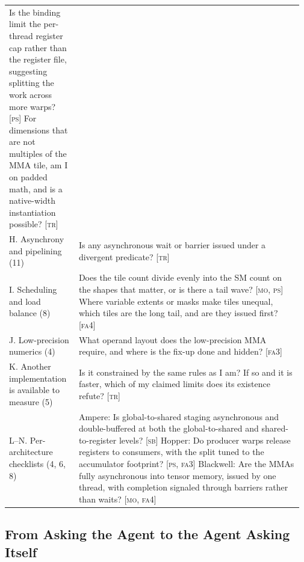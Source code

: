 \begin{table}[tbp]
\begin{tabular}{@{}>{\raggedright\arraybackslash}p{0.23\linewidth}>{\raggedright\arraybackslash}p{0.74\linewidth}@{}}
Is the binding limit the per-thread register cap rather than the register file, suggesting splitting the work across more warps? [\textsc{ps}]
\newline For dimensions that are not multiples of the MMA tile, am I on padded math, and is a native-width instantiation possible? [\textsc{tr}] \\
\addlinespace
H. Asynchrony and pipelining (11) &
Is any asynchronous wait or barrier issued under a divergent predicate? [\textsc{tr}] \\
\addlinespace
I. Scheduling and load balance (8) &
Does the tile count divide evenly into the SM count on the shapes that matter, or is there a tail wave? [\textsc{mo}, \textsc{ps}]
\newline Where variable extents or masks make tiles unequal, which tiles are the long tail, and are they issued first? [\textsc{fa4}] \\
\addlinespace
J. Low-precision numerics (4) &
What operand layout does the low-precision MMA require, and where is the fix-up done and hidden? [\textsc{fa3}] \\
\addlinespace
K. Another implementation is available to measure (5) &
Is it constrained by the same rules as I am? If so and it is faster, which of my claimed limits does its existence refute? [\textsc{tr}] \\
\addlinespace
L--N. Per-architecture checklists (4, 6, 8) &
Ampere: Is global-to-shared staging asynchronous and double-buffered at both the global-to-shared and shared-to-register levels? [\textsc{sb}]
\newline Hopper: Do producer warps release registers to consumers, with the split tuned to the accumulator footprint? [\textsc{ps}, \textsc{fa3}]
\newline Blackwell: Are the MMAs fully asynchronous into tensor memory, issued by one thread, with completion signaled through barriers rather than waits? [\textsc{mo}, \textsc{fa4}] \\
\bottomrule
\end{tabular}
\end{table}

\subsection{From Asking the Agent to the Agent Asking Itself}
\label{kernelseek:sec:workflow-skill}

